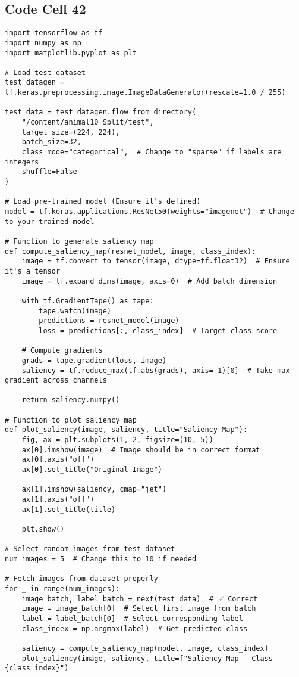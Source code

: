 \documentclass{article}
\begin{document}
\subsection*{Code Cell 42}
\begin{lstlisting}
import tensorflow as tf
import numpy as np
import matplotlib.pyplot as plt

# Load test dataset
test_datagen = tf.keras.preprocessing.image.ImageDataGenerator(rescale=1.0 / 255)

test_data = test_datagen.flow_from_directory(
    "/content/animal10_Split/test",
    target_size=(224, 224),
    batch_size=32,
    class_mode="categorical",  # Change to "sparse" if labels are integers
    shuffle=False
)

# Load pre-trained model (Ensure it's defined)
model = tf.keras.applications.ResNet50(weights="imagenet")  # Change to your trained model

# Function to generate saliency map
def compute_saliency_map(resnet_model, image, class_index):
    image = tf.convert_to_tensor(image, dtype=tf.float32)  # Ensure it's a tensor
    image = tf.expand_dims(image, axis=0)  # Add batch dimension

    with tf.GradientTape() as tape:
        tape.watch(image)
        predictions = resnet_model(image)
        loss = predictions[:, class_index]  # Target class score

    # Compute gradients
    grads = tape.gradient(loss, image)
    saliency = tf.reduce_max(tf.abs(grads), axis=-1)[0]  # Take max gradient across channels

    return saliency.numpy()

# Function to plot saliency map
def plot_saliency(image, saliency, title="Saliency Map"):
    fig, ax = plt.subplots(1, 2, figsize=(10, 5))
    ax[0].imshow(image)  # Image should be in correct format
    ax[0].axis("off")
    ax[0].set_title("Original Image")

    ax[1].imshow(saliency, cmap="jet")
    ax[1].axis("off")
    ax[1].set_title(title)

    plt.show()

# Select random images from test dataset
num_images = 5  # Change this to 10 if needed

# Fetch images from dataset properly
for _ in range(num_images):
    image_batch, label_batch = next(test_data)  # ✅ Correct
    image = image_batch[0]  # Select first image from batch
    label = label_batch[0]  # Select corresponding label
    class_index = np.argmax(label)  # Get predicted class

    saliency = compute_saliency_map(model, image, class_index)
    plot_saliency(image, saliency, title=f"Saliency Map - Class {class_index}")
\end{lstlisting}
\end{document}
